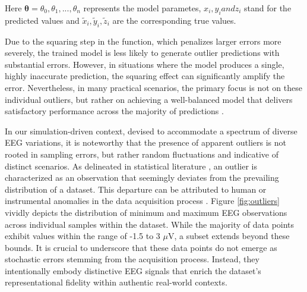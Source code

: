 \documentclass[a4paper, UKenglish, 11pt]{uiomaster}
\begin{document}
Here $\boldsymbol{\theta} = \theta_0, \theta_1, ..., \theta_n$ represents the model parametes, $x_i, y_i and z_i$ stand for the predicted values and $\tilde{x}_i, \tilde{y}_i, \tilde{z}_i$ are the corresponding true values.

Due to the squaring step in the function, which penalizes larger errors more severely, the trained model is less likely to generate outlier predictions with substantial errors. However, in situations where the model produces a single, highly inaccurate prediction, the squaring effect can significantly amplify the error. Nevertheless, in many practical scenarios, the primary focus is not on these individual outliers, but rather on achieving a well-balanced model that delivers satisfactory performance across the majority of predictions \cite{builtin-ml-loss-functions}.

In our simulation-driven context, devised to accommodate a spectrum of diverse EEG variations, it is noteworthy that the presence of apparent outliers is not rooted in sampling errors, but rather random fluctuations and indicative of distinct scenarios. As delineated in statistical literature \cite{barnett1994outliers}, an outlier is characterized as an observation that seemingly deviates from the prevailing distribution of a dataset. This departure can be attributed to human or instrumental anomalies in the data acquisition process \cite{zhang2015outlier}. Figure \ref{fig:outliers} vividly depicts the distribution of minimum and maximum EEG observations across individual samples within the dataset. While the majority of data points exhibit values within the range of -1.5 to 3 $\mu$V, a subset extends beyond these bounds. It is crucial to underscore that these data points do not emerge as stochastic errors stemming from the acquisition process. Instead, they intentionally embody distinctive EEG signals that enrich the dataset's representational fidelity within authentic real-world contexts.
\end{document}
